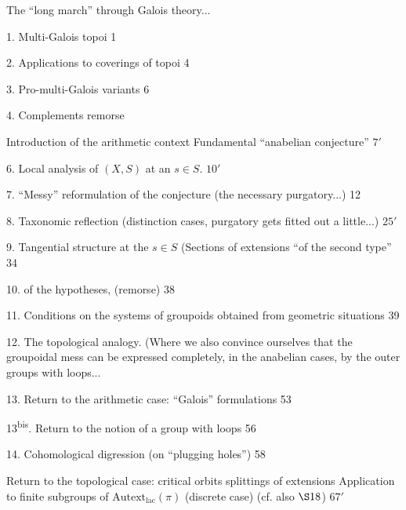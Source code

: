 


The ``long march'' through Galois theory...

1. Multi-Galois topoi \hfill 1

2. Applications to coverings of topoi \hfill 4

3. Pro-multi-Galois variants \hfill 6

4. Complements remorse


 Introduction of the arithmetic context
Fundamental ``anabelian conjecture'' \hfill \(7'\)

6. Local analysis of \((X,S)\) at an \(s\in S\). \hfill \(10'\)

7. ``Messy'' reformulation of the conjecture
(the necessary purgatory...) \hfill 12

8. Taxonomic reflection (distinction 
cases,  purgatory gets fitted out a little...) \hfill \(25'\)

9. Tangential structure at the \(s\in S\)
(Sections of extensions ``of the second type'' \hfill 34

10.  of the hypotheses, (remorse) \hfill 38

11. Conditions on the systems of groupoids obtained from
geometric situations \hfill 39

12. The topological analogy. (Where we also convince ourselves that the groupoidal
mess can be expressed completely, in the anabelian cases,
by the outer groups with loops... \hfill {}

13. Return to the arithmetic case: ``Galois'' formulations \hfill 53

13\textsuperscript{bis}. Return to the notion of a group with loops \hfill 56

14. Cohomological digression (on ``plugging holes'') \hfill 58

 Return to the topological case: critical orbits
 splittings of extensions
Application to finite subgroups of
\(\mathrm{Autext}_{\mathrm{lac}}(\pi)\) (discrete case)
(cf. also \(\S 18\)) \hfill \(67'\)

